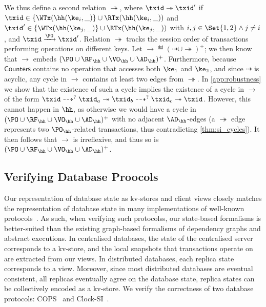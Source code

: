 We thus define a second relation $\twoheadrightarrow$, where
$\txid \twoheadrightarrow \txid'$ if $\txid \in \{\WTx(\hh(\ke_{i}, \_)\} \cup \RTx(\hh(\ke_{i}, \_))$ 
and $\txid' \in \{\WTx(\hh(\ke_{j}, \_)\} \cup \RTx(\hh(\ke_{j}, \_))$ with $i,j \in \Set{1,2} \land j \neq i$,  
and $\txid \xrightarrow{\PO} \txid'$.
Relation $\twoheadrightarrow$ tracks the session order of transactions performing operations on different keys. 
Let $\rightarrow \eqdef (\dashrightarrow \cup \twoheadrightarrow)^{+}$; 
we then know that $\rightarrow$ embeds $(\PO \cup \RF_{\hh} \cup \VO_{\hh} \cup \AD_{\hh})^{+}$.
Furthermore, because $\mathsf{Counters}$ contains no operation that accesses both $\ke_1$ and $\ke_2$, and since $\dashrightarrow$ is acyclic, 
any cycle in $\rightarrow$ contains at least two edges from $\twoheadrightarrow$. 
In \cref{app:robustness} we show that the existence of such a cycle implies the 
existence of a cycle in $\rightarrow$ of the form $\txid \dashrightarrow^{?} \txid_{a} \twoheadrightarrow 
\txid_{b} \dashrightarrow^{?} \txid_{c} \twoheadrightarrow \txid$. 
However, this cannot happen in $\hh$, as otherwise we would have a cycle in $(\PO \cup \RF_{\hh} \cup \VO_{\hh} \cup \AD_{\hh})^{+}$ with no adjacent $\AD_{\hh}$-edges (a $\twoheadrightarrow$ edge represents two  $\PO_{\hh}$-related transactions, 
thus contradicting \cref{thm:si_cycles}). 
It then follows that $\rightarrow$ is irreflexive, and thus so is $(\PO \cup \RF_{\hh} \cup \VO_{\hh} \cup \AD_{\hh})^+$.

\vspace*{-7pt}
\subsection{Verifying Database Proocols}
\vspace*{-7pt}
\label{sec:verify-impl}
%
Our representation of database state as kv-stores and client views closely matches the representation of database state in many implementations of 
well-known protocols~\cite{ramp,rola,cops,wren,redblue,PSI,NMSI,gdur,clocksi,distrsi}.
As such, when verifying such protocolss, our state-based formalisms is better-suited than the existing graph-based formalisms of dependency graphs and abstract executions. 
In centralised databases, the state of the centralised server corresponds to a kv-store,
and the local snapshots that transactions operate on are extracted from our views.  
In distributed databases, each replica state corresponds to a view. 
Moreover, since most distributed databases are eventual consistent, 
\ie all replicas eventually agree on the database state,
replica states can be collectively encoded as a kv-store.
We verify the correctness of two database protocols:
COPS~\cite{cops} and Clock-SI~\cite{clocksi}.

